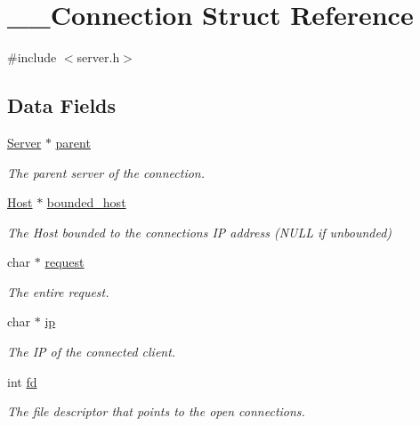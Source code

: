 \hypertarget{struct_____connection}{}\section{\+\_\+\+\_\+\+Connection Struct Reference}
\label{struct_____connection}


{\ttfamily \#include $<$server.\+h$>$}

\subsection*{Data Fields}
\begin{DoxyCompactItemize}
\item 
\mbox{\hyperlink{server_8h_a705d964b8a67edeeb3943273a397e4c2}{Server}} $\ast$ \mbox{\hyperlink{struct_____connection_ad4b092dd27ad2126d0a6ee313e14c430}{parent}}
\begin{DoxyCompactList}\small\item\em The parent server of the connection. \end{DoxyCompactList}\item 
\mbox{\hyperlink{host_8h_a30ca67c0ed1f344be0c570271ecfc489}{Host}} $\ast$ \mbox{\hyperlink{struct_____connection_a141d30c3e0a43c1a460797bfd4e4d581}{bounded\+\_\+host}}
\begin{DoxyCompactList}\small\item\em The Host bounded to the connections IP address (N\+U\+LL if unbounded) \end{DoxyCompactList}\item 
char $\ast$ \mbox{\hyperlink{struct_____connection_aee994fd59229c469bc2489350a981590}{request}}
\begin{DoxyCompactList}\small\item\em The entire request. \end{DoxyCompactList}\item 
char $\ast$ \mbox{\hyperlink{struct_____connection_a4612124e8b89da32e748c7a5377ad554}{ip}}
\begin{DoxyCompactList}\small\item\em The IP of the connected client. \end{DoxyCompactList}\item 
int \mbox{\hyperlink{struct_____connection_a49433c1edd3dd2f86a724047f9de2414}{fd}}
\begin{DoxyCompactList}\small\item\em The file descriptor that points to the open connections. \end{DoxyCompactList}\item 

\end{DoxyCompactItemize}
